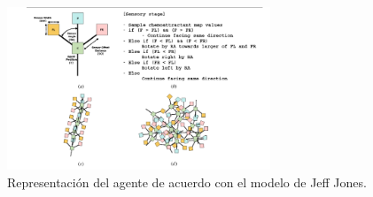     \begin{figure}[h]
        \centering
        \includegraphics[width=0.7\textwidth]{./images/estado_del_arte/physarum/pseudoJones.png}
        \caption{Representaci\'on del agente de acuerdo con el modelo de Jeff Jones. \cite{Jones2015}}
        \label{fig:pseudocodigo}
    \end{figure}
\clearpage